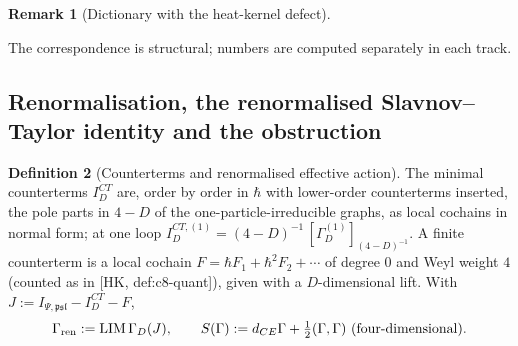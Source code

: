 \documentclass[11pt]{article}
\theoremstyle{definition}
\newtheorem{definition}{Definition}[section]
\newtheorem{remark}[definition]{Remark}
\numberwithin{equation}{section}
\begin{document}
\begin{remark}[Dictionary with the heat-kernel defect]
\label{rem:dict}
\mbox{}\par\smallskip{}\par\smallskip

The correspondence is structural; numbers are computed separately in each track.
\end{remark}

\subsection{Renormalisation, the renormalised Slavnov--Taylor identity and the obstruction}

\begin{definition}[Counterterms and renormalised effective action]
\label{def:ren}
The minimal counterterms $I^{CT}_D$ are, order by order in $\hbar$ with lower-order counterterms inserted, the pole parts in $4-D$ of the one-particle-irreducible graphs, as local cochains in normal form; at one loop $I^{CT,(1)}_D=(4-D)^{-1}\,[\Gamma^{(1)}_D]_{(4-D)^{-1}}$. A finite counterterm is a local cochain $F=\hbar F_1+\hbar^2F_2+\cdots$ of degree $0$ and Weyl weight $4$ (counted as in [HK, def:c8-quant]), given with a $D$-dimensional lift. With $J:=I_{\Psi,\mathfrak{psl}}-I^{CT}_D-F$,
\[
\Gamma_{\rm ren}:=\mathrm{LIM}\,\Gamma_D(J),\qquad S(\Gamma):=d_{CE}\Gamma+\tfrac12(\Gamma,\Gamma)\ \text{(four-dimensional)}.
\]
\end{definition}
\end{document}
